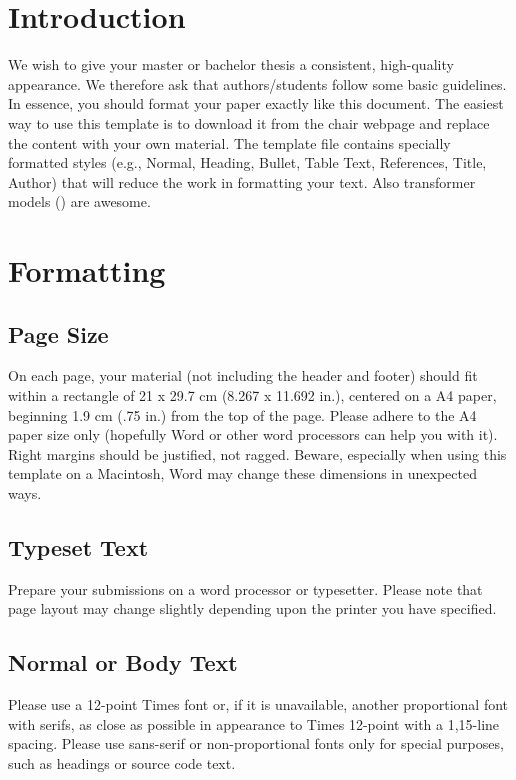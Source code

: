 \documentclass[11pt]{article}
\begin{document}
\tableofcontents

\newpage


\section{Introduction}
We wish to give your master or bachelor thesis a consistent, high-quality appearance. We therefore ask that authors/students follow some basic guidelines. In essence, you should format your paper exactly like this document. The easiest way to use this template is to download it from the chair webpage and replace the content with your own material. The template file contains specially formatted styles (e.g., Normal, Heading, Bullet, Table Text, References, Title, Author) that will reduce the work in formatting your text. 
Also transformer models (\cite{attentionIsAllYouNeed}) are awesome.

\section{Formatting}
\subsection{Page Size}
On each page, your material (not including the header and footer) should fit within a rectangle of 21 x 29.7 cm (8.267 x 11.692 in.), centered on a A4 paper, beginning 1.9 cm (.75 in.) from the top of the page. Please adhere to the A4 paper size only (hopefully Word or other word processors can help you with it). Right margins should be justified, not ragged. Beware, especially when using this template on a Macintosh, Word may change these dimensions in unexpected ways.

\subsection{Typeset Text}
Prepare your submissions on a word processor or typesetter. Please note that page layout may change slightly depending upon the printer you have specified.

\subsection{Normal or Body Text}
Please use a 12-point Times font or, if it is unavailable, another proportional font with serifs, as close as possible in appearance to Times 12-point with a 1,15-line spacing. Please use sans-serif or non-proportional fonts only for special purposes, such as headings or source code text.
\end{document}
